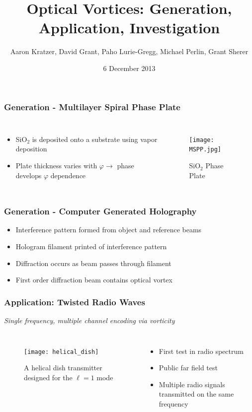 \documentclass[xcolor=dvipsnames]{beamer}
\title{Optical Vortices: Generation, Application, Investigation}
\author{Aaron Kratzer, David Grant, Paho Lurie-Gregg,
  Michael Perlin, Grant Sherer}
\date{6 December 2013}
\newenvironment{items}[1][]
{\begin{itemize}
    \ifthenelse{\isempty{#1}}
    {\setlength{\itemsep}{12pt}}{\setlength{\itemsep}{#1}}}
  {\end{itemize}}
\renewcommand{\phi}{\varphi} %
\begin{document}
\begin{frame}
  \maketitle
\end{frame}

\begin{frame}
        \frametitle{Generation - Multilayer Spiral Phase Plate}
  \begin{columns}[c]
    \begin{items}
    \item SiO$_2$ is deposited onto a substrate using vapor deposition
    \item Plate thickness varies with $\phi\to$ phase
      develops $\phi$ dependence

    \end{items}
    \begin{figure}
      \texttt{[image: MSPP.jpg]}
      \caption{SiO$_2$ Phase Plate}
      \label{MSPP}
    \end{figure}
  \end{columns}
\end{frame}

\begin{frame}
        \frametitle{Generation - Computer Generated Holography}
  \begin{items}
  \item Interference pattern formed from object and reference beams
  \item Hologram filament printed of interference pattern
  \item Diffraction occurs as beam passes through filament
  \item First order diffraction beam contains optical vortex
  \end{items}
\end{frame}

\begin{frame}
        \frametitle{Application: Twisted Radio Waves}
        \begin{center}
                \emph{Single frequency, multiple channel encoding via vorticity}
        \end{center}
  \begin{columns}[c]
    \begin{figure}
      \texttt{[image: helical\_dish]}
      \caption{A helical dish transmitter designed for the $\ell=1$
        mode}
      \label{pic:dish}
    \end{figure}
                \begin{items}
                \item First test in radio spectrum
                \item Public far field test
                \item Multiple radio signals transmitted on the same frequency
                \end{items}
        \end{columns}
\end{frame}
\end{document}
